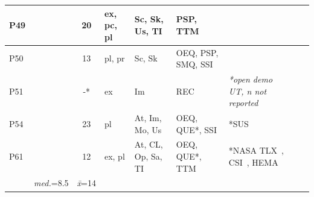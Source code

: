 \documentclass[sigconf, screen, review]{acmart}
\begin{document}
\begin{table}[t]
\begin{tabularx}{\textwidth}{llclllllX}
P49 &\cite{sun2018mr}                     & 20           & ex, pc, pl  & Sc, Sk, Us, TI         & PSP, TTM              &   \\ \hline
P50 &\cite{pan2018pilot}                  & 13           & pl, pr      & Sc, Sk                 & OEQ, PSP, SMQ, SSI    &  \\ \hline
P51 &\cite{granieri2019reach}             & -*           & ex          & Im                     & REC                   & \textit{*open demo UT, n not reported}  \\ \hline 
P54 &\cite{molloy2019mixed}               & 23           & pl          & At, Im, Mo, Us         & OEQ, QUE*, SSI        & *SUS~\cite{lewis2009factor}\\ \hline
P61 &\cite{karolus2020hit}                & 12           & ex, pl      & At, CL, Op, Sa, TI     & OEQ, QUE*, TTM                  &  *NASA TLX~\cite{hart1988development}, CSI~\cite{carroll2009creativity}, HEMA~\cite{huta2010pursuing} \\ \midrule 
                                   & \textit{med.}=8.5 & \textit{\={x}}=14   &                   &                       & \\ \bottomrule
\end{tabularx}%
\end{table}
\end{document}

